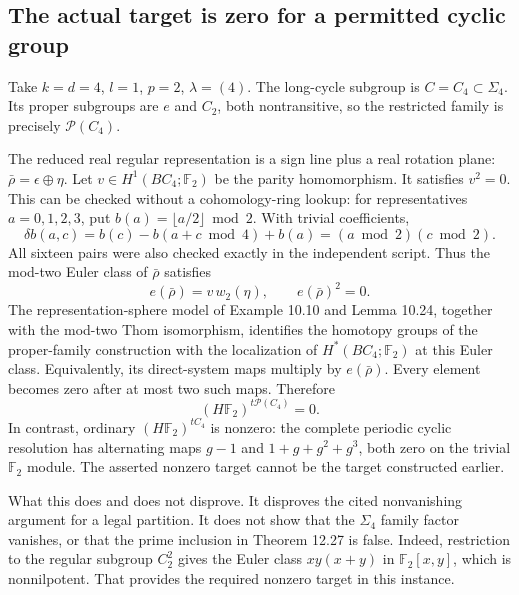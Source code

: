 \documentclass[10pt]{article}
\begin{document}
\subsection*{The actual target is zero for a permitted cyclic group}
Take \(k=d=4\), \(l=1\), \(p=2\), \(\lambda=(4)\). The long-cycle subgroup is \(C=C_4\subset\Sigma_4\). Its proper subgroups are \(e\) and \(C_2\), both nontransitive, so the restricted family is precisely \(\mathcal P(C_4)\).\par
The reduced real regular representation is a sign line plus a real rotation plane: \(\bar\rho=\epsilon\oplus\eta\). Let \(v\in H^1(BC_4;\mathbb F_2)\) be the parity homomorphism. It satisfies \(v^2=0\). This can be checked without a cohomology-ring lookup: for representatives \(a=0,1,2,3\), put \(b(a)=\lfloor a/2\rfloor\bmod2\). With trivial coefficients, \[\delta b(a,c)=b(c)-b(a+c\bmod4)+b(a)
             =(a\bmod2)(c\bmod2).\] All sixteen pairs were also checked exactly in the independent script. Thus the mod-two Euler class of \(\bar\rho\) satisfies \[e(\bar\rho)=v\,w_2(\eta),\qquad e(\bar\rho)^2=0.\] The representation-sphere model of Example 10.10 and Lemma 10.24, together with the mod-two Thom isomorphism, identifies the homotopy groups of the proper-family construction with the localization of \(H^*(BC_4;\mathbb F_2)\) at this Euler class. Equivalently, its direct-system maps multiply by \(e(\bar\rho)\). Every element becomes zero after at most two such maps. Therefore \[(H\mathbb F_2)^{t\mathcal P(C_4)}=0.\] In contrast, ordinary \((H\mathbb F_2)^{tC_4}\) is nonzero: the complete periodic cyclic resolution has alternating maps \(g-1\) and \(1+g+g^2+g^3\), both zero on the trivial \(\mathbb F_2\) module. The asserted nonzero target cannot be the target constructed earlier.\par
What this does and does not disprove. It disproves the cited nonvanishing argument for a legal partition. It does not show that the \(\Sigma_4\) family factor vanishes, or that the prime inclusion in Theorem 12.27 is false. Indeed, restriction to the regular subgroup \(C_2^2\) gives the Euler class \(xy(x+y)\) in \(\mathbb F_2[x,y]\), which is nonnilpotent. That provides the required nonzero target in this instance.\par
\end{document}
